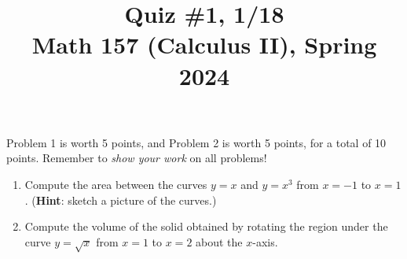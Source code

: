 \documentclass[11pt]{article}
\title{Quiz \#1, 1/18 \\ Math 157 (Calculus II), Spring 2024}
\date{}
\begin{document}
\maketitle

\thispagestyle{empty}

\vspace{-2cm}

Problem 1 is worth 5 points, and Problem 2 is worth 5 points, for a total of 10 points. Remember to \emph{show your work} on all problems!

\begin{enumerate}
\item Compute the area between the curves $y=x$ and $y=x^3$ from $x=-1$ to $x=1$. ({\bf Hint}: sketch a picture of the curves.)

\vspace{8cm}

\item Compute the volume of the solid obtained by rotating the region under the curve $y=\sqrt{x}$ from $x=1$ to $x=2$ about the $x$-axis.

\end{enumerate}
\end{document}
